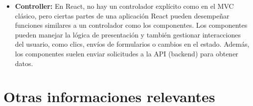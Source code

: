 \documentclass{report}
\begin{document}
\begin{itemize}
\begin{itemize}
            \item \textbf{Controller:} En React, no hay un controlador explícito como en el MVC clásico, pero ciertas partes de una aplicación React pueden desempeñar funciones similares a un controlador como los componentes. Los componentes pueden manejar la lógica de presentación y también gestionar interacciones del usuario, como clics, envíos de formularios o cambios en el estado. Además, los componentes suelen enviar solicitudes a la API (backend) para obtener datos.
        \end{itemize}
    \end{itemize}

    \section*{Otras informaciones relevantes}
\end{document}
